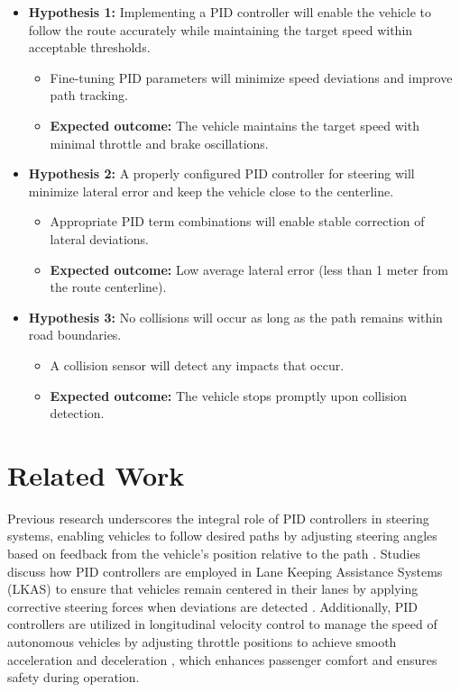 \documentclass[conference]{IEEEtran}
\begin{document}
\begin{itemize}
    \item \textbf{Hypothesis 1:} Implementing a PID controller will enable the vehicle to follow the route accurately while maintaining the target speed within acceptable thresholds.
        \begin{itemize}
            \item Fine-tuning PID parameters will minimize speed deviations and improve path tracking.
            \item \textbf{Expected outcome:} The vehicle maintains the target speed with minimal throttle and brake oscillations.
        \end{itemize}

    \item \textbf{Hypothesis 2:} A properly configured PID controller for steering will minimize lateral error and keep the vehicle close to the centerline.
        \begin{itemize}
            \item Appropriate PID term combinations will enable stable correction of lateral deviations.
            \item \textbf{Expected outcome:} Low average lateral error (less than 1 meter from the route centerline).
        \end{itemize}

    \item \textbf{Hypothesis 3:} No collisions will occur as long as the path remains within road boundaries.
        \begin{itemize}
            \item A collision sensor will detect any impacts that occur.
            \item \textbf{Expected outcome:} The vehicle stops promptly upon collision detection.
        \end{itemize}
\end{itemize}

\section{Related Work}

Previous research underscores the integral role of PID controllers in steering systems, enabling vehicles to follow desired paths by adjusting steering angles based on feedback from the vehicle's position relative to the path \cite{10.5772/51314,10.25165/j.ijabe.20241701.7296}. Studies discuss how PID controllers are employed in Lane Keeping Assistance Systems (LKAS) to ensure that vehicles remain centered in their lanes by applying corrective steering forces when deviations are detected \cite{10.4218/etrij.15.0114.0123}. Additionally, PID controllers are utilized in longitudinal velocity control to manage the speed of autonomous vehicles by adjusting throttle positions to achieve smooth acceleration and deceleration \cite{10.22214/ijraset.2021.32866}, which enhances passenger comfort and ensures safety during operation.
\end{document}
